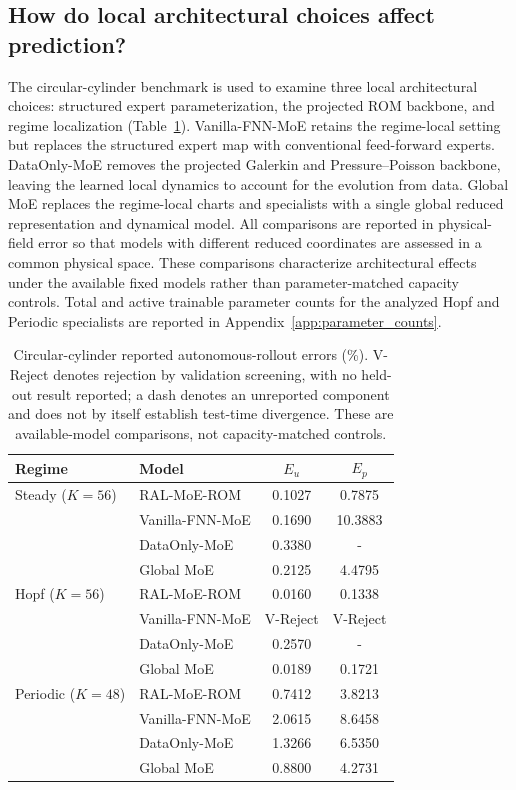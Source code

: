 \documentclass{article}
\begin{document}
\subsection{How do local architectural choices affect prediction?}

The circular-cylinder benchmark is used to examine three local architectural choices: structured expert parameterization, the projected ROM backbone, and regime localization (Table~\ref{tab:circular_full_reorg}). Vanilla-FNN-MoE retains the regime-local setting but replaces the structured expert map with conventional feed-forward experts. DataOnly-MoE removes the projected Galerkin and Pressure--Poisson backbone, leaving the learned local dynamics to account for the evolution from data. Global MoE replaces the regime-local charts and specialists with a single global reduced representation and dynamical model. All comparisons are reported in physical-field error so that models with different reduced coordinates are assessed in a common physical space. These comparisons characterize architectural effects under the available fixed models rather than parameter-matched capacity controls. Total and active trainable parameter counts for the analyzed Hopf and Periodic specialists are reported in Appendix~\ref{app:parameter_counts}.

\begin{table}[H]
\centering
\caption{Circular-cylinder reported autonomous-rollout errors (\%). V-Reject denotes rejection by validation screening, with no held-out result reported; a dash denotes an unreported component and does not by itself establish test-time divergence. These are available-model comparisons, not capacity-matched controls.}
\label{tab:circular_full_reorg}
\small
\setlength{\tabcolsep}{4pt}
\begin{tabular}{llcc}
\toprule
Regime & Model & $E_u$ & $E_p$ \\
\midrule
Steady ($K=56$)
& RAL-MoE-ROM & 0.1027 & 0.7875 \\
& Vanilla-FNN-MoE & 0.1690 & 10.3883 \\
& DataOnly-MoE & 0.3380 & - \\
& Global MoE & 0.2125 & 4.4795 \\
\midrule
Hopf ($K=56$)
& RAL-MoE-ROM & 0.0160 & 0.1338 \\
& Vanilla-FNN-MoE & V-Reject & V-Reject \\
& DataOnly-MoE & 0.2570 & - \\
& Global MoE & 0.0189 & 0.1721 \\
\midrule
Periodic ($K=48$)
& RAL-MoE-ROM & 0.7412 & 3.8213 \\
& Vanilla-FNN-MoE & 2.0615 & 8.6458 \\
& DataOnly-MoE & 1.3266 & 6.5350 \\
& Global MoE & 0.8800 & 4.2731 \\
\bottomrule
\end{tabular}
\end{table}
\end{document}

